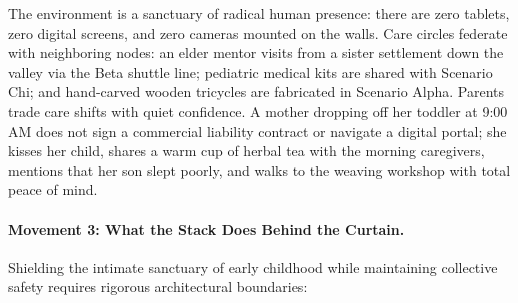 The environment is a sanctuary of radical human presence: there are zero tablets, zero digital screens, and zero cameras mounted on the walls. Care circles federate with neighboring nodes: an elder mentor visits from a sister settlement down the valley via the Beta shuttle line; pediatric medical kits are shared with Scenario Chi; and hand-carved wooden tricycles are fabricated in Scenario Alpha. Parents trade care shifts with quiet confidence. A mother dropping off her toddler at 9:00 AM does not sign a commercial liability contract or navigate a digital portal; she kisses her child, shares a warm cup of herbal tea with the morning caregivers, mentions that her son slept poorly, and walks to the weaving workshop with total peace of mind.

\paragraph{Movement 3: What the Stack Does Behind the Curtain.}
Shielding the intimate sanctuary of early childhood while maintaining collective safety requires rigorous architectural boundaries:
